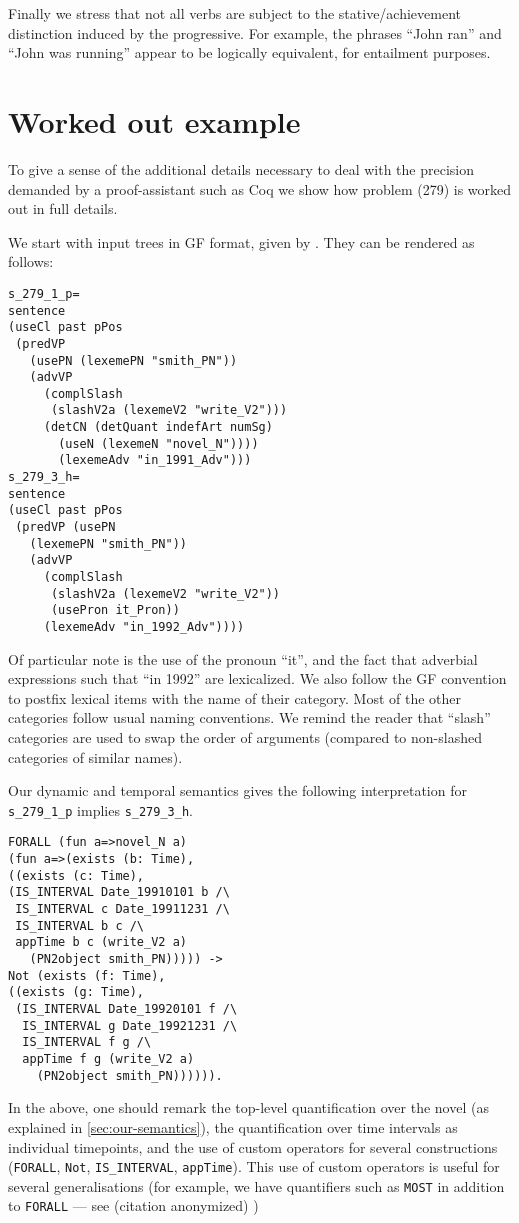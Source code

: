 \documentclass[11pt,a4paper]{article}
\begin{document}
Finally we stress that not all verbs are subject to the
stative/achievement distinction induced by the progressive. For
example, the phrases ``John ran'' and ``John was running'' appear to
be logically equivalent, for entailment purposes.


\section{Worked out example}
To give a sense of the additional details necessary to deal with the
precision demanded by a proof-assistant such as Coq we show how
problem (279) is worked out in full details.

We start with input trees in GF format, given by
\citet{Ljunglof:2012}. They can be rendered as follows:

\begin{small}
\begin{verbatim}
s_279_1_p=
sentence
(useCl past pPos
 (predVP
   (usePN (lexemePN "smith_PN"))
   (advVP
     (complSlash
      (slashV2a (lexemeV2 "write_V2")))
     (detCN (detQuant indefArt numSg)
       (useN (lexemeN "novel_N"))))
       (lexemeAdv "in_1991_Adv")))
s_279_3_h=
sentence
(useCl past pPos
 (predVP (usePN
   (lexemePN "smith_PN"))
   (advVP
     (complSlash
      (slashV2a (lexemeV2 "write_V2"))
      (usePron it_Pron))
     (lexemeAdv "in_1992_Adv"))))
\end{verbatim}
\end{small}

Of particular note is the use of the pronoun ``it'', and the fact that
adverbial expressions such that ``in 1992'' are lexicalized.  We also
follow the GF convention to postfix lexical items with the name of
their category. Most of the other categories follow usual naming
conventions. We remind the reader that ``slash'' categories are used
to swap the order of arguments (compared to non-slashed categories of
similar names).

Our dynamic and temporal semantics gives the following interpretation
for \verb!s_279_1_p! implies \verb!s_279_3_h!.
{\small
\begin{verbatim}
FORALL (fun a=>novel_N a)
(fun a=>(exists (b: Time),
((exists (c: Time),
(IS_INTERVAL Date_19910101 b /\
 IS_INTERVAL c Date_19911231 /\
 IS_INTERVAL b c /\
 appTime b c (write_V2 a)
   (PN2object smith_PN))))) ->
Not (exists (f: Time),
((exists (g: Time),
 (IS_INTERVAL Date_19920101 f /\
  IS_INTERVAL g Date_19921231 /\
  IS_INTERVAL f g /\
  appTime f g (write_V2 a) 
    (PN2object smith_PN)))))).
\end{verbatim}
}
In the above, one should remark the top-level quantification over the
novel (as explained in \cref{sec:our-semantics}), the quantification
over time intervals as individual timepoints, and the use of custom
operators for several constructions (\verb!FORALL!, \verb!Not!, \verb!IS_INTERVAL!,
\verb!appTime!). This use of custom operators is useful for several
generalisations (for example, we have quantifiers such as \verb!MOST! in
addition to \verb!FORALL! --- see \ifanon (citation anonymized)
\else \citet{bernardy_type-theoretical_2017} \fi)
\end{document}
